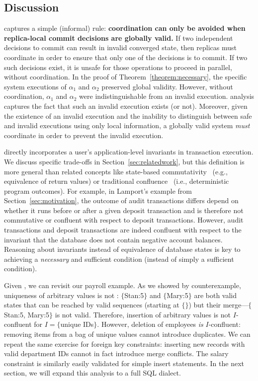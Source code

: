 \subsection{Discussion}

\iconfluence captures a simple (informal) rule: \textbf{coordination
  can only be avoided when replica-local commit decisions are globally
  valid.} If two independent decisions to commit can result in invalid
converged state, then replicas must coordinate in order to ensure that
only one of the decisions is to commit. If two such decisions exist,
it is unsafe for those operations to proceed in parallel, without
coordination. In the proof of Theorem~\ref{theorem:necessary}, the
specific system executions of $\alpha_1$ and $\alpha_2$ preserved
global validity. However, without coordination, $\alpha_1$ and
$\alpha_2$ were indistinguishable from an invalid
execution. \iconfluence analysis captures the fact that such an
invalid execution exists (or not). Moreover, given the existence of an
invalid execution and the inability to distinguish between safe and
invalid executions using only local information, a globally valid
system \textit{must} coordinate in order to prevent the invalid
execution.

\iconfluence directly incorporates a user's application-level
invariants in transaction execution. We discuss specific trade-offs in
Section~\ref{sec:relatedwork}, but this definition is more general
than related concepts like state-based
commutativity~\cite{weihl-thesis} (e.g., equivalence of return values)
or traditional confluence~\cite{calm,termrewriting} (i.e.,
deterministic program outcomes). For example, in Lamport's example
from Section~\ref{sec:motivation}, the outcome of audit transactions
differs depend on whether it runs before or after a given deposit
transaction and is therefore not commutative or confluent with respect
to deposit transactions. However, audit transactions and deposit
transactions are indeed confluent with respect to the invariant that
the database does not contain negative account balances. Reasoning
about invariants instead of equivalence of database states is key to
achieving a \textit{necessary} and sufficient condition (instead of
simply a sufficient condition).

 Given \iconfluence, we can revisit our
payroll example. As we showed by counterexample, uniqueness of
arbitrary values is not \iconfluent: $\{$Stan:5$\}$ and $\{$Mary:5$\}$
are both valid states that can be reached by valid sequences (starting
at $\{\}$) but their merge---$\{$Stan:5, Mary:5$\}$ is not
valid. Therefore, insertion of arbitrary values is not $I$-confluent
for $I=\{$unique IDs$\}$. However, deletion of employees \textit{is}
$I$-confluent: removing items from a bag of unique values cannot
introduce duplicates. We can repeat the same exercise for foreign key
constraints: inserting new records with valid department IDs cannot in
fact introduce merge conflicts. The salary constraint is similarly
easily validated for simple insert statements. In the next section, we
will expand this analysis to a full SQL dialect.
